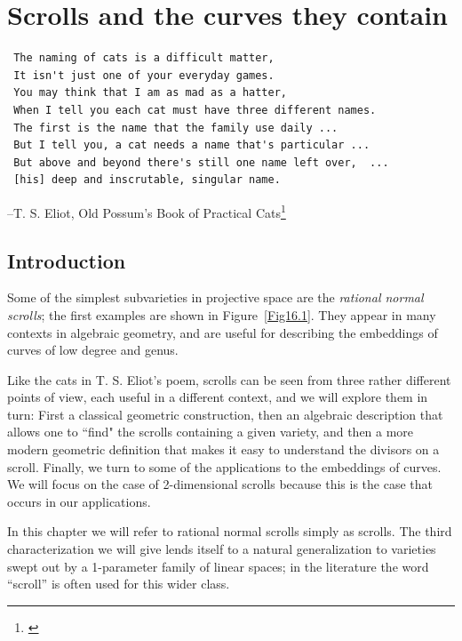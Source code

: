 


\chapter{Scrolls and the curves they contain}
\label{ScrollsChapter}


\begin{verbatim}
 The naming of cats is a difficult matter,
 It isn't just one of your everyday games.
 You may think that I am as mad as a hatter,
 When I tell you each cat must have three different names.
 The first is the name that the family use daily ...
 But I tell you, a cat needs a name that's particular ...
 But above and beyond there's still one name left over,  ...	
 [his] deep and inscrutable, singular name.
\end{verbatim}
--T. S. Eliot, Old Possum's Book of Practical Cats\footnote{\cite{PracticalCats}}
%

\section*{Introduction}
Some of the simplest subvarieties in projective space are the \emph{rational normal scrolls}; the first examples
are shown in Figure~\ref{Fig16.1}. They appear in many contexts in algebraic geometry, and are useful for describing the embeddings of curves of low degree and genus. 

Like the cats in T. S. Eliot's poem, scrolls can be seen from three rather different points of view, each useful in a different context, and we will explore them in turn: First a classical geometric construction, then an algebraic description that allows one to ``find" the scrolls containing a given variety, and then a more modern geometric definition that makes it easy to understand the divisors on a scroll. Finally, we turn to some of the applications to the embeddings of curves. We will focus on the case of 2-dimensional scrolls because this is the case that occurs in our applications.

In this chapter we will refer to rational normal scrolls simply as scrolls. The third characterization we will give lends itself to a natural generalization to  varieties swept out by a 1-parameter family of linear spaces; in the literature the word ``scroll'' is often used for this wider class.

